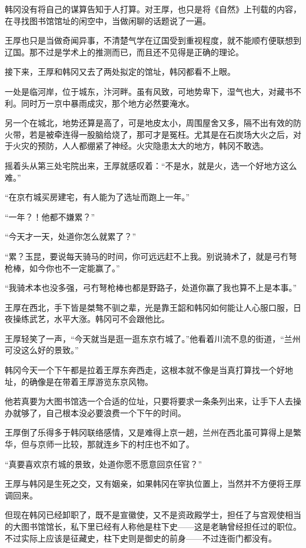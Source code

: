 韩冈没有将自己的谋算告知于人打算。对王厚，也只是将《自然》上刊载的内容，在寻找图书馆馆址的闲空中，当做闲聊的话题说了一遍。

王厚也只是当做奇闻异事，不清楚气学在辽国受到重视程度，就不能顺冇便联想到辽国。那不过是学术上的推测而已，而且还不见得是正确的理论。

接下来，王厚和韩冈又去了两处拟定的馆址，韩冈都看不上眼。

一处是临河岸，位于城东，汴河畔。虽有风致，可地势卑下，湿气也大，对藏书不利。同时万一京中暴雨成灾，那个地方必然要淹水。

另一个在城北，地势还算是高了，可是地皮太小，周围屋舍又多，隔不出有效的防火带，若是被牵连得一股脑给烧了，那可才是冤枉。尤其是在石炭场大火之后，对于火灾的预防，人人都绷紧了神经。火灾隐患太大的地方，韩冈不敢选。

摇着头从第三处宅院出来，王厚就感叹着：“不是水，就是火，选一个好地方这么难。”

“在京冇城买房建宅，有人能为了选址而跑上一年。”

“一年？！他都不嫌累？”

“今天才一天，处道你怎么就累了？”

“累？玉昆，要说每天骑马的时间，你可远远赶不上我。别说骑术了，就是弓冇弩枪棒，如今你也不一定能赢了。”

“我骑术本也没多强，弓冇弩枪棒也都是野路子，处道你赢了我也算不上是本事。”

王厚在西北，手下皆是桀骜不驯之辈，光是靠王韶和韩冈如何能让人心服口服，日夜操练武艺，水平大涨。韩冈可不会跟他比。

王厚轻笑了一声，“今天就当是逛一逛东京冇城了。”他看着川流不息的街道，“兰州可没这么好的景致。”

韩冈今天一个下午都是拉着王厚东奔西走，这根本就不像是当真打算找一个好地址，的确像是在带着王厚游览东京风物。

他若真要为大图书馆选一个合适的位址，只要将要求一条条列出来，让手下人去操办就够了，自己根本没必要浪费一个下午的时间。

王厚倒了乐得多于韩冈联络感情，又是难得上京一趟，兰州在西北虽可算得上是繁华，但与京师一比较，那就连乡下的村庄也不如了。

“真要喜欢京冇城的景致，处道你愿不愿意回京任官？”

王厚与韩冈是生死之交，又有姻亲，如果韩冈在宰执位置上，当然并不方便将王厚调回来。

但现在韩冈已经卸职了，既不是宣徽使，又不是资政殿学士，担任了与宫观使相当的大图书馆馆长，私下里已经有人称他是柱下史——这是老聃曾经担任过的职位。不过实际上应该是征藏史，柱下史则是御史的前身——不过连衙门都没有。

